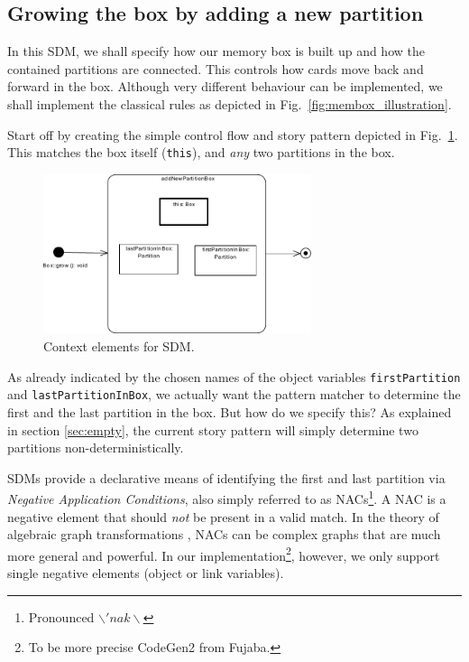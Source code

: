 \subsection{Growing the box by adding a new partition}
	
In this SDM, we shall specify how our memory box is built up and how the
contained partitions are connected.  This controls how cards move back and
forward in the box.  Although very different behaviour can be implemented, we
shall implement the classical rules as depicted in
Fig.~\ref{fig:membox_illustration}.

Start off by creating the simple control flow and story pattern depicted in
Fig.~\ref{fig:sdm_grow_1}.  This matches the box itself (\texttt{this}), and
\emph{any} two partitions in the box.
	
\begin{figure}[htp]
\begin{center}
  \includegraphics[width=0.7\textwidth]{pics/sdmBilder/grow/sdm57}
  \caption{Context elements for SDM.}  
  \label{fig:sdm_grow_1}
\end{center}
\end{figure}

As already indicated by the chosen names of the object variables
\texttt{first\-Partition} and \texttt{last\-Partition\-In\-Box}, we actually
want the pattern matcher to determine the first and the last partition in the box.
But how do we specify this?  As explained in section \ref{sec:empty}, the
current story pattern will simply determine two partitions
non-deterministically.  

SDMs provide a declarative means of identifying the first and last
partition via \emph{Negative Application Conditions}, also simply
referred to as \mbox{NACs}\footnote{Pronounced $\backslash 'nak \backslash$}.
A \mbox{NAC} is a negative element that should \emph{not} be present in a valid
match.  In the theory of algebraic graph transformations \cite{EEPT06},
\mbox{NACs} can be complex graphs that are much more general and powerful.  In
our implementation\footnote{To be more precise CodeGen2 from Fujaba.}, however,
we only support single negative elements (object or link variables).

